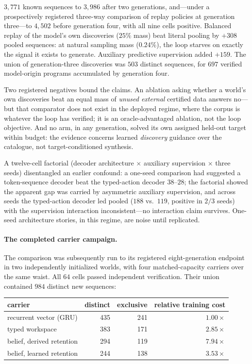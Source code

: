 \documentclass[11pt]{article}
\begin{document}
$3{,}771$ known sequences to $3{,}986$ after two generations, and---under a
prospectively registered three-way comparison of replay policies at generation
three---to $4{,}502$ before generation four, with all nine cells positive. Balanced
replay of the model's own discoveries ($25\%$ mass) beat literal pooling by $+308$
pooled sequences: at natural sampling mass ($0.24\%$), the loop starves on exactly the
signal it exists to generate. Auxiliary predictive supervision added $+159$. The union
of generation-three discoveries was $503$ distinct sequences, for $697$ verified
model-origin programs accumulated by generation four.

Two registered negatives bound the claims. An ablation asking whether a world's own
discoveries beat an equal mass of \emph{unused external} certified data answers
no---but that comparator does not exist in the deployed regime, where the corpus is
whatever the loop has verified; it is an oracle-advantaged ablation, not the loop
objective. And no arm, in any generation, solved its own assigned held-out target
within budget: the evidence concerns learned \emph{discovery} guidance over the
catalogue, not target-conditioned synthesis.

A twelve-cell factorial (decoder architecture $\times$ auxiliary supervision $\times$
three seeds) disentangled an earlier confound: a one-seed comparison had suggested a
token-sequence decoder beat the typed-action decoder $38$--$28$; the factorial showed
the apparent gap was carried by asymmetric auxiliary supervision, and across seeds the
typed-action decoder led pooled ($188$ vs.\ $119$, positive in $2/3$ seeds) with the
supervision interaction inconsistent---no interaction claim survives. One-seed
architecture stories, in this regime, are noise until replicated.

\paragraph{The completed carrier campaign.}
The comparison was subsequently run to its registered eight-generation endpoint in two
independently initialized worlds, with four matched-capacity carriers over the same
waist. All $64$ cells passed independent verification. Their union contained $984$
distinct new sequences:

\begin{center}\small
\begin{tabular}{@{}lrrr@{}}
\toprule
carrier & distinct & exclusive & relative training cost \\
\midrule
recurrent vector (GRU) & 435 & 241 & $1.00\times$ \\
typed workspace & 383 & 171 & $2.85\times$ \\
belief, derived retention & 294 & 119 & $7.94\times$ \\
belief, learned retention & 244 & 138 & $3.53\times$ \\
\bottomrule
\end{tabular}
\end{center}
\end{document}
